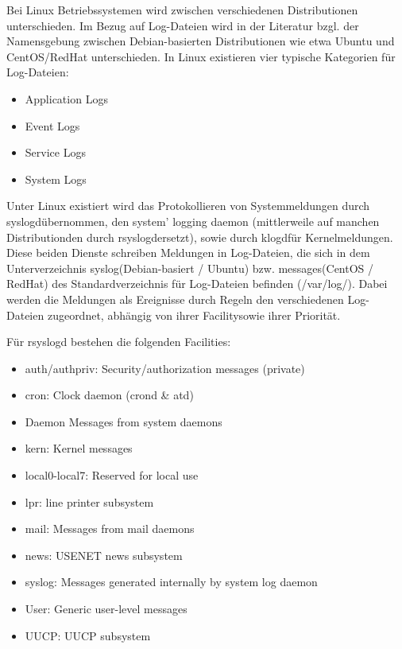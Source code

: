 Bei Linux Betriebssystemen wird zwischen verschiedenen Distributionen unterschieden. Im Bezug auf Log-Dateien wird in der Literatur bzgl. der Namensgebung zwischen Debian-basierten Distributionen wie etwa Ubuntu und CentOS/RedHat unterschieden. 
In Linux existieren vier typische Kategorien für Log-Dateien:
\begin{itemize}
\item Application Logs
\item Event Logs
\item Service Logs
\item System Logs
\end{itemize}
\citep{Linux1}

Unter Linux existiert wird das Protokollieren von Systemmeldungen durch \glqq syslogd\grqq  übernommen, den system' logging daemon (mittlerweile auf manchen Distributionden durch \glqq rsyslogd\grqq  ersetzt), sowie durch \glqq klogd\grqq  für Kernelmeldungen. Diese beiden Dienste schreiben Meldungen in Log-Dateien, die sich in dem Unterverzeichnis \glqq syslog\grqq  (Debian-basiert / Ubuntu) bzw. \glqq messages\grqq  (CentOS / RedHat) des Standardverzeichnis für Log-Dateien befinden (/var/log/). Dabei werden die Meldungen als Ereignisse durch Regeln den verschiedenen Log-Dateien zugeordnet, abhängig von ihrer \glqq Facility\grqq  sowie ihrer Priorität. 

Für rsyslogd bestehen die folgenden Facilities:
\begin{itemize}
\item auth/authpriv: Security/authorization messages (private)
\item cron: Clock daemon (crond \& atd)
\item Daemon Messages from system daemons
\item kern: Kernel messages
\item local0-local7: Reserved for local use
\item lpr: line printer subsystem
\item mail: Messages from mail daemons
\item news: USENET news subsystem
\item syslog: Messages generated internally by system log daemon
\item User: Generic user-level messages
\item UUCP: UUCP subsystem
\end{itemize}


